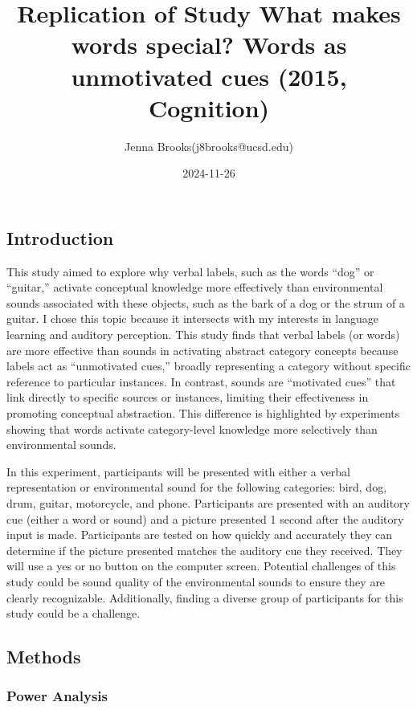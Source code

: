 \documentclass[
  letterpaper,
  DIV=11,
  numbers=noendperiod]{scrartcl}
\title{Replication of Study What makes words special? Words as
unmotivated cues (2015, Cognition)}
\author{Jenna Brooks(j8brooks@ucsd.edu)}
\date{2024-11-26}
\renewcommand*\contentsname{Table of contents}
\newcommand\contentsname{Table of contents}
\begin{document}
\maketitle

\renewcommand*\contentsname{Table of contents}
{
\hypersetup{linkcolor=}
\setcounter{tocdepth}{3}
\tableofcontents
}

\subsection{Introduction}\label{introduction}

This study aimed to explore why verbal labels, such as the words ``dog''
or ``guitar,'' activate conceptual knowledge more effectively than
environmental sounds associated with these objects, such as the bark of
a dog or the strum of a guitar. I chose this topic because it intersects
with my interests in language learning and auditory perception. This
study finds that verbal labels (or words) are more effective than sounds
in activating abstract category concepts because labels act as
``unmotivated cues,'' broadly representing a category without specific
reference to particular instances. In contrast, sounds are ``motivated
cues'' that link directly to specific sources or instances, limiting
their effectiveness in promoting conceptual abstraction. This difference
is highlighted by experiments showing that words activate category-level
knowledge more selectively than environmental sounds.

In this experiment, participants will be presented with either a verbal
representation or environmental sound for the following categories:
bird, dog, drum, guitar, motorcycle, and phone. Participants are
presented with an auditory cue (either a word or sound) and a picture
presented 1 second after the auditory input is made. Participants are
tested on how quickly and accurately they can determine if the picture
presented matches the auditory cue they received. They will use a yes or
no button on the computer screen. Potential challenges of this study
could be sound quality of the environmental sounds to ensure they are
clearly recognizable. Additionally, finding a diverse group of
participants for this study could be a challenge.

\subsection{Methods}\label{methods}

\subsubsection{Power Analysis}\label{power-analysis}
\end{document}

